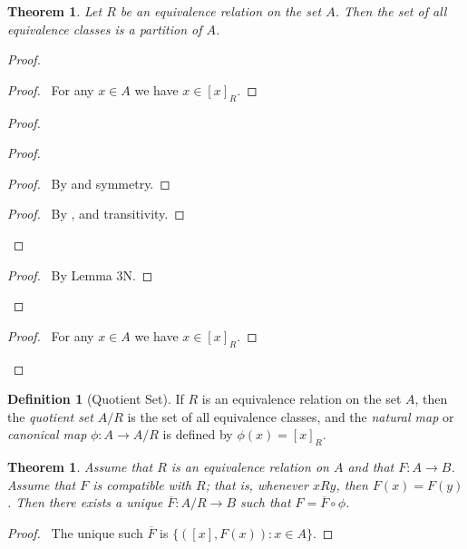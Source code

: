 \documentclass{article}
\let\qed\relax
\newtheorem{theorem}[axiom]{Theorem}
\theoremstyle{definition}
\newtheorem{definition}[axiom]{Definition}
\begin{document}
    \begin{theorem}
        Let $R$ be an equivalence relation on the set $A$. Then the set of all equivalence classes is a
        partition of $A$.
    \end{theorem}

    \begin{proof}
        \pf
        \begin{proof}
            \pf\ For any $x \in A$ we have $x \in [x]_R$.
        \end{proof}
        \begin{proof}
            \begin{proof}
                \begin{proof}
                    \pf\ By  and symmetry.
                \end{proof}
                \begin{proof}
                    \pf\ By ,  and transitivity.
                \end{proof}
            \end{proof}
            \begin{proof}
                \pf\ By Lemma 3N.
            \end{proof}
        \end{proof}
        \begin{proof}
            \pf\ For any $x \in A$ we have $x \in [x]_R$.
        \end{proof}
        \qed
    \end{proof}

    \begin{definition}[Quotient Set]
        If $R$ is an equivalence relation on the set $A$, then the \emph{quotient set} $A / R$
        is the set of all equivalence classes, and the \emph{natural map} or \emph{canonical map}
        $\phi : A \rightarrow A/R$ is defined by $\phi(x) = [x]_R$.
    \end{definition}

    \begin{theorem}
        Assume that $R$ is an equivalence relation on $A$ and that $F : A \rightarrow B$.
        Assume that $F$ is \emph{compatible} with $R$; that is, whenever $xRy$, then $F(x) = F(y)$.
        Then there exists a unique $\overline{F} : A / R \rightarrow B$ such that $F = \overline{F} \circ \phi$.
    \end{theorem}

    \begin{proof}
        \pf\ The unique such $\overline{F}$ is $\{ ([x],F(x)) : x \in A \}$. \qed
    \end{proof}
    
\end{document}
